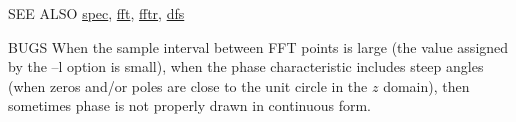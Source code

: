 \begin{qsection}{SEE ALSO}
\hyperlink{spec}{spec},
\hyperlink{fft}{fft},
\hyperlink{fftr}{fftr},
\hyperlink{dfs}{dfs}
\end{qsection}

\begin{qsection}{BUGS}
When the sample interval between FFT points is large
(the value assigned by the --l option is small),
when the phase characteristic includes steep angles
(when zeros and/or poles are close to the unit circle in the $z$
 domain), then sometimes phase is not properly drawn in continuous form.
\end{qsection}
